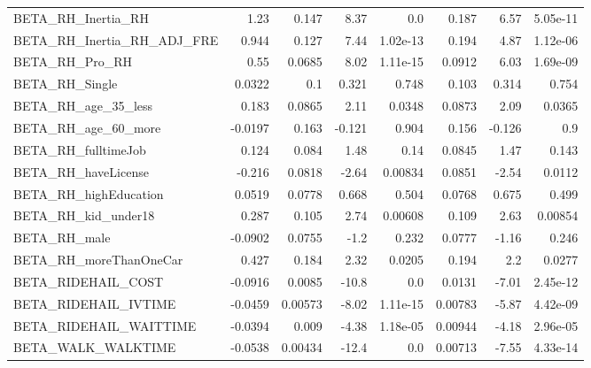 \begin{tabular}{lrrrrrrr}
BETA\_RH\_Inertia\_RH               &      1.23 &    0.147 &      8.37 &      0.0 &         0.187 &         6.57 &      5.05e-11 \\
BETA\_RH\_Inertia\_RH\_ADJ\_FRE       &     0.944 &    0.127 &      7.44 & 1.02e-13 &         0.194 &         4.87 &      1.12e-06 \\
BETA\_RH\_Pro\_RH                   &      0.55 &   0.0685 &      8.02 & 1.11e-15 &        0.0912 &         6.03 &      1.69e-09 \\
BETA\_RH\_Single                   &    0.0322 &      0.1 &     0.321 &    0.748 &         0.103 &        0.314 &         0.754 \\
BETA\_RH\_age\_35\_less              &     0.183 &   0.0865 &      2.11 &   0.0348 &        0.0873 &         2.09 &        0.0365 \\
BETA\_RH\_age\_60\_more              &   -0.0197 &    0.163 &    -0.121 &    0.904 &         0.156 &       -0.126 &           0.9 \\
BETA\_RH\_fulltimeJob              &     0.124 &    0.084 &      1.48 &     0.14 &        0.0845 &         1.47 &         0.143 \\
BETA\_RH\_haveLicense              &    -0.216 &   0.0818 &     -2.64 &  0.00834 &        0.0851 &        -2.54 &        0.0112 \\
BETA\_RH\_highEducation            &    0.0519 &   0.0778 &     0.668 &    0.504 &        0.0768 &        0.675 &         0.499 \\
BETA\_RH\_kid\_under18              &     0.287 &    0.105 &      2.74 &  0.00608 &         0.109 &         2.63 &       0.00854 \\
BETA\_RH\_male                     &   -0.0902 &   0.0755 &      -1.2 &    0.232 &        0.0777 &        -1.16 &         0.246 \\
BETA\_RH\_moreThanOneCar           &     0.427 &    0.184 &      2.32 &   0.0205 &         0.194 &          2.2 &        0.0277 \\
BETA\_RIDEHAIL\_COST               &   -0.0916 &   0.0085 &     -10.8 &      0.0 &        0.0131 &        -7.01 &      2.45e-12 \\
BETA\_RIDEHAIL\_IVTIME             &   -0.0459 &  0.00573 &     -8.02 & 1.11e-15 &       0.00783 &        -5.87 &      4.42e-09 \\
BETA\_RIDEHAIL\_WAITTIME           &   -0.0394 &    0.009 &     -4.38 & 1.18e-05 &       0.00944 &        -4.18 &      2.96e-05 \\
BETA\_WALK\_WALKTIME               &   -0.0538 &  0.00434 &     -12.4 &      0.0 &       0.00713 &        -7.55 &      4.33e-14 \\

\end{tabular}
